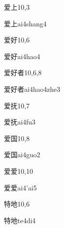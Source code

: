 \begin{entry}{爱上}{10,3}
  \begin{phonetics}{爱上}{ai4shang4}
  \end{phonetics}
\end{entry}

\begin{entry}{爱好}{10,6}
  \begin{phonetics}{爱好}{ai4hao4}
  \end{phonetics}
\end{entry}

\begin{entry}{爱好者}{10,6,8}
  \begin{phonetics}{爱好者}{ai4hao4zhe3}
  \end{phonetics}
\end{entry}

\begin{entry}{爱抚}{10,7}
  \begin{phonetics}{爱抚}{ai4fu3}
  \end{phonetics}
\end{entry}

\begin{entry}{爱国}{10,8}
  \begin{phonetics}{爱国}{ai4guo2}
  \end{phonetics}
\end{entry}

\begin{entry}{爱爱}{10,10}
  \begin{phonetics}{爱爱}{ai4'ai5}
  \end{phonetics}
\end{entry}

\begin{entry}{特地}{10,6}
  \begin{phonetics}{特地}{te4di4}
  \end{phonetics}
\end{entry}

